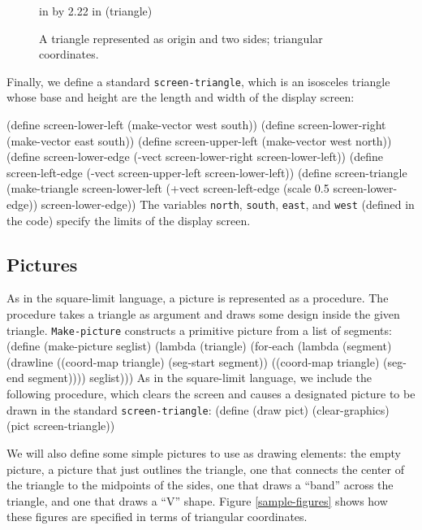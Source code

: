 \begin{figure}
 in by 2.22 in (triangle)
\caption{{\protect\footnotesize
A triangle represented as origin and two sides; triangular
coordinates.}}
\label{triangle}
\end{figure} 

Finally, we define a standard {\tt screen-triangle}, which is an
isosceles triangle whose base and height are the length and width of the
display screen:

\beginlisp
(define screen-lower-left (make-vector west south))
(define screen-lower-right (make-vector east south))
(define screen-upper-left (make-vector  west north))
\null
(define screen-lower-edge
  (-vect screen-lower-right screen-lower-left))
\null
(define screen-left-edge
  (-vect screen-upper-left screen-lower-left))
\pagebreak
(define screen-triangle
  (make-triangle screen-lower-left
                 (+vect screen-left-edge
                        (scale 0.5 screen-lower-edge))
                 screen-lower-edge))
\endlisp
The variables {\tt north}, {\tt south}, {\tt east}, and {\tt west}
(defined in the code) specify the limits of the display screen.

\subsection{Pictures}

As in the square-limit language, a picture is represented as a procedure.
The procedure
takes a triangle as argument and draws some design inside the given
triangle.  {\tt Make-picture} constructs a primitive picture from a
list of segments:
\beginlisp
(define (make-picture seglist)
  (lambda (triangle)
    (for-each
     (lambda (segment)
       (drawline ((coord-map triangle) (seg-start segment))
                 ((coord-map triangle) (seg-end segment))))
     seglist)))
\endlisp
As in the square-limit language, we include the following procedure,
which clears the screen and causes a designated picture to be drawn in
the standard {\tt screen-triangle}:
\beginlisp
(define (draw pict)
  (clear-graphics)
  (pict screen-triangle))
\endlisp


We will also define some simple pictures to use as drawing elements:
the empty picture, a picture that just outlines the triangle, one that
connects the center of the triangle to the midpoints of the sides, one
that draws a ``band'' across the triangle, and one that draws a ``V''
shape.  Figure \ref{sample-figures} shows how these figures are
specified in terms of triangular coordinates.

